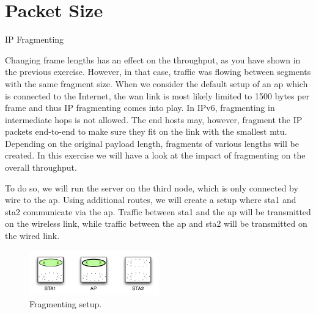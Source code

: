 \section{Packet Size}
\begin{exercise}{IP Fragmenting}

	Changing frame lengths has an effect on the throughput, as you have shown in the previous exercise. However, in that case, traffic was flowing between segments with the  same fragment size. When we consider the default setup of an \ac{ap} which is connected to the Internet, the \ac{wan} link is most likely limited to 1500 bytes per frame and thus IP fragmenting comes into play. In IPv6, fragmenting in intermediate hops is not allowed. The end hosts may, however, fragment the IP packets end-to-end to make sure they fit on the link with the smallest \ac{mtu}. Depending on the original payload length, fragments of various lengths will be created. In this exercise we will have a look at the impact of fragmenting on the overall throughput.
	
	To do so, we will run the  server on the third node, which is only connected by wire to the \ac{ap}. Using additional routes, we will create a setup where \ac{sta}1 and \ac{sta}2 communicate via the \ac{ap}. Traffic between \ac{sta}1 and the \ac{ap} will be transmitted on the wireless link, while traffic between the \ac{ap} and \ac{sta}2 will be transmitted on the wired link.
	
	\begin{figure}[h!]
		\begin{center}
			\includegraphics[width=0.5\textwidth]{images/perf1.pdf}
			\caption{Fragmenting setup.} 
			\label{fig:fragmenting} 
		\end{center}
	\end{figure}




\end{exercise}
